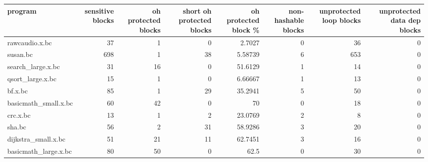 \begin{table}[ht]
\begin{adjustbox}{width=1.3\textwidth}
\begin{tabular}{lrrrrrrr}
\hline
 program              &   sensitive blocks &   oh protected blocks &   short oh protected blocks &   oh protected block \% &   non-hashable blocks &   unprotected loop blocks &   unprotected data dep blocks \\
\hline
 rawcaudio.x.bc       &                 37 &                     1 &                           0 &                2.7027  &                     0 &                        36 &                             0 \\
 susan.bc             &                698 &                     1 &                          38 &                5.58739 &                     6 &                       653 &                             0 \\
 search\_large.x.bc    &                 31 &                    16 &                           0 &               51.6129  &                     1 &                        14 &                             0 \\
 qsort\_large.x.bc     &                 15 &                     1 &                           0 &                6.66667 &                     1 &                        13 &                             0 \\
 bf.x.bc              &                 85 &                     1 &                          29 &               35.2941  &                     5 &                        50 &                             0 \\
 basicmath\_small.x.bc &                 60 &                    42 &                           0 &               70       &                     0 &                        18 &                             0 \\
 crc.x.bc             &                 13 &                     1 &                           2 &               23.0769  &                     2 &                         8 &                             0 \\
 sha.bc               &                 56 &                     2 &                          31 &               58.9286  &                     3 &                        20 &                             0 \\
 dijkstra\_small.x.bc  &                 51 &                    21 &                          11 &               62.7451  &                     3 &                        16 &                             0 \\
 basicmath\_large.x.bc &                 80 &                    50 &                           0 &               62.5     &                     0 &                        30 &                             0 \\

\end{tabular}
\end{adjustbox}
\end{table}
